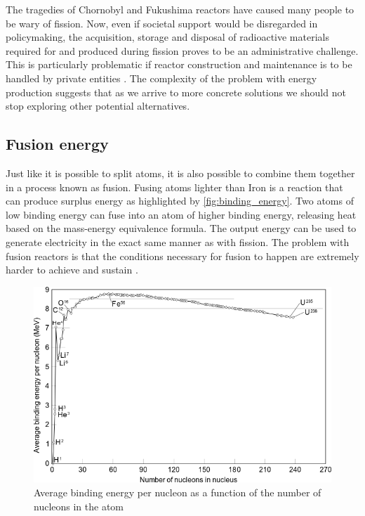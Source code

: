   The tragedies of Chornobyl and Fukushima reactors
  have caused many people to be wary of fission. Now, even if
  societal support would be disregarded in policymaking, the acquisition,
  storage and disposal of radioactive materials required for and produced 
  during fission proves to be an administrative challenge.
  This is particularly problematic 
  if reactor construction and maintenance is to be handled
  by private entities \cite{fission_tech_and_current_issues}. 
  The complexity of the problem with energy production suggests that 
  as we arrive to more concrete solutions we 
  should not stop exploring other potential alternatives.

\subsection{Fusion energy}

  Just like it is possible to split atoms, it is also possible to
  combine them together in a process known as fusion. 
  Fusing atoms lighter than Iron is a reaction that 
  can produce surplus energy as highlighted by \autoref{fig:binding_energy}.
  Two atoms of low binding energy can fuse into an atom of higher 
  binding energy, releasing heat based on the mass-energy equivalence formula.
  The output energy can be used to generate electricity in
  the exact same manner as with fission. 
  The problem with fusion reactors is that the conditions necessary
  for fusion to happen are extremely harder to achieve and sustain 
  \cite{structural_materials_fusion}.

  \begin{figure}[H]
	\centering
	\includegraphics[width=.90\linewidth]{media/binding_energy.png}
	\caption{Average binding energy per nucleon as a function of the number of nucleons in the atom}
	\label{fig:binding_energy}
  \end{figure}

